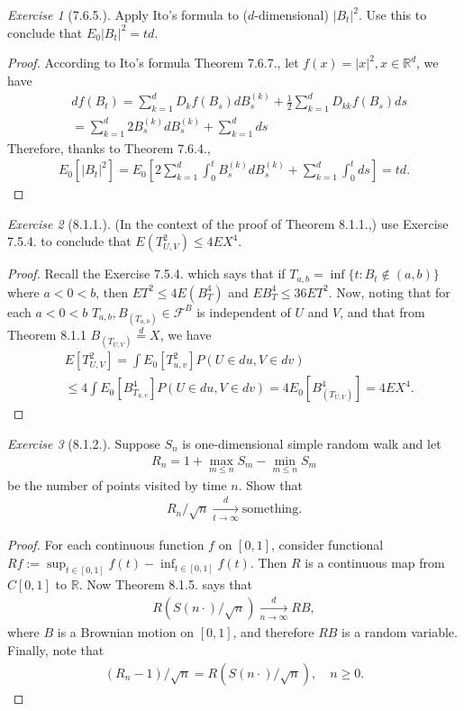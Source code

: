\documentclass[12pt,a4paper]{amsart}
\theoremstyle{plain}
\theoremstyle{definition}
\theoremstyle{remark}
\newtheorem*{exe}{Exercise}
\numberwithin{equation}{section}
\begin{document}
\begin{exe}[7.6.5.]
Apply Ito's formula to ($d$-dimensional) $|B_t|^2$. 
Use this to conclude that $E_0 |B_t|^2 = td$.
\end{exe}
\begin{proof}
According to Ito's formula Theorem 7.6.7., let $f(x) = |x|^2, x\in \mathbb R^d$, we have 
\begin{align}
  &df(B_t)
= \sum_{k=1}^d D_kf(B_s) dB^{(k)}_s + \frac{1}{2} \sum_{k=1}^d D_{kk} f(B_s)ds
\\&  = \sum_{k=1}^d 2B^{(k)}_s dB^{(k)}_s + \sum_{k=1}^d ds
\end{align}
Therefore, thanks to Theorem 7.6.4.,
\begin{align}
  E_0\left[ |B_t|^2 \right] 
= E_0\left[ 2\sum_{k=1}^d \int_0^t B^{(k)}_s dB^{(k)}_s + \sum_{k=1}^d\int_0^t ds \right]
= td.
\end{align}
\end{proof}
\begin{exe}[8.1.1.]
(In the context of the proof of Theorem 8.1.1.,) use Exercise 7.5.4. to conclude that $E(T_{U,V}^2)\leq 4 EX^4$.
\end{exe} 
\begin{proof}
Recall the Exercise 7.5.4. which says that if $T_{a,b} = \inf\{t: B_t\not\in (a,b)\}$ where $a < 0< b$, then $E T^2 \leq 4 E(B_T^4)$ and $EB_T^4 \leq 36 ET^2$. Now, noting that for each $a<0<b$ $T_{a,b}, B_{(T_{a,b})} \in \mathcal F^B$ is independent of $U$ and $V$, and that from Theorem 8.1.1 $B_{(T_{U,V})} \overset{d}= X$, we have
\begin{align}
 & E\left[ T_{U,V}^2 \right] 
  = \int  E_0\left[ T^2_{u,v} \right]  P\left( U\in du, V \in dv \right) 
  \\& \leq 4 \int E_0\left[ B_{T_{u,v}}^4 \right] P\left( U \in du, V \in dv \right)  
  = 4 E_0 \left[ B_{(T_{U,V})}^4 \right] 
= 4 E X^4 .
\end{align} 
\end{proof}
\begin{exe}[8.1.2.]
Suppose $S_n$ is one-dimensional simple random walk and let 
\begin{align}
R_n = 1 + \max_{m\leq n} S_m - \min_{m\leq n} S_m
\end{align}
be the number of points visited by time $n$. 
Show that 
\begin{align}
R_n / \sqrt{n} \xrightarrow[t\to \infty]{d} \text{something}.
\end{align}
\end{exe}
\begin{proof}
For each continuous function $f$ on $[0,1]$, consider functional 
$Rf:= \sup_{t\in [0,1]} f(t) - \inf_{t\in [0,1]} f(t) $.
Then $R$ is a continuous map from $C[0,1]$ to $\mathbb R$.
Now Theorem 8.1.5. says that
\begin{align}
R \left( S(n \cdot)/\sqrt{n} \right) \xrightarrow[n\to \infty]{d} R B,
\end{align}
where $B$ is a Brownian motion on $[0,1]$, and therefore $RB$ is a random variable.
Finally, note that
\begin{align}
(R_n-1)/\sqrt{n} = R(S(n\cdot)/\sqrt{n}), \quad n\geq 0.
\end{align}
\end{proof}
\end{document}
